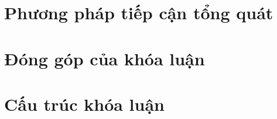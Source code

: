\section{Phương pháp tiếp cận tổng quát}

\section{Đóng góp của khóa luận}

\section{Cấu trúc khóa luận}
